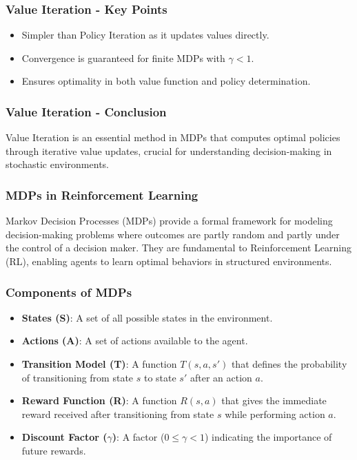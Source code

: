 \documentclass[aspectratio=169]{beamer}
\begin{document}
\begin{frame}[fragile]
    \frametitle{Value Iteration - Key Points}
    \begin{itemize}
        \item Simpler than Policy Iteration as it updates values directly.
        \item Convergence is guaranteed for finite MDPs with \(\gamma < 1\).
        \item Ensures optimality in both value function and policy determination.
    \end{itemize}
\end{frame}

\begin{frame}[fragile]
    \frametitle{Value Iteration - Conclusion}
    Value Iteration is an essential method in MDPs that computes optimal policies through iterative value updates, crucial for understanding decision-making in stochastic environments.
\end{frame}

\begin{frame}[fragile]
    \frametitle{MDPs in Reinforcement Learning}
    Markov Decision Processes (MDPs) provide a formal framework for modeling decision-making problems where outcomes are partly random and partly under the control of a decision maker. They are fundamental to Reinforcement Learning (RL), enabling agents to learn optimal behaviors in structured environments.
\end{frame}

\begin{frame}[fragile]
    \frametitle{Components of MDPs}
    \begin{itemize}
        \item \textbf{States (S)}: A set of all possible states in the environment.
        \item \textbf{Actions (A)}: A set of actions available to the agent.
        \item \textbf{Transition Model (T)}: A function $T(s, a, s')$ that defines the probability of transitioning from state $s$ to state $s'$ after an action $a$.
        \item \textbf{Reward Function (R)}: A function $R(s, a)$ that gives the immediate reward received after transitioning from state $s$ while performing action $a$.
        \item \textbf{Discount Factor ($\gamma$)}: A factor ($0 \leq \gamma < 1$) indicating the importance of future rewards.
    \end{itemize}
\end{frame}
\end{document}
